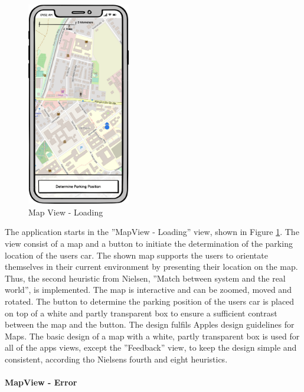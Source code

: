 \begin{figure}[h]
    \centering
    \includegraphics[width=0.4\textwidth]{images/UI/Iteration4-MapView-Loading.png}
    \caption{Map View - Loading}
    \label{fig:mv-loading}
\end{figure}

The application starts in the ''MapView - Loading'' view, shown in Figure \ref{fig:mv-loading}. The view consist of a map and a button to initiate the determination of the parking location of the users car. The shown map supports the users to orientate themselves in their current environment by presenting their location on the map. Thus, the second heuristic from Nielsen, ''Match between system and the real world'', is implemented. The map is interactive and can be zoomed, moved and rotated. The button to determine the parking position of the users car is placed on top of a white and partly transparent box to ensure a sufficient contrast between the map and the button. The design fulfils Apples design guidelines for Maps. The basic design of a map with a white, partly transparent box is used for all of the apps views, except the ''Feedback'' view, to keep the design simple and consistent, according tho Nielsens fourth and eight heuristics. \cite{nielsen1994usability} \cite{apple:interfaceguidliines}


\paragraph{MapView - Error}

